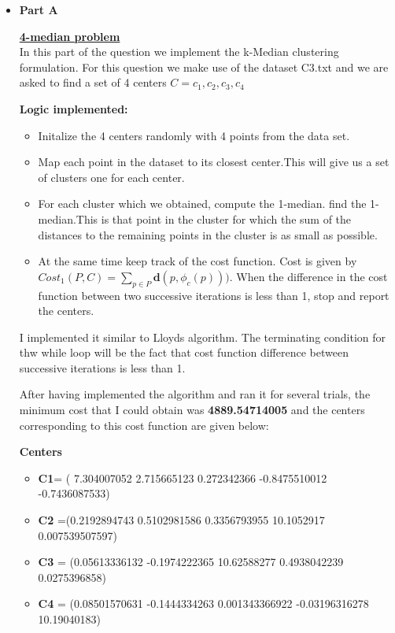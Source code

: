 \documentclass[11pt]{article}
\begin{document}
\begin{itemize}
	\item[] \textbf{Part A}
	
	\underline{\textbf{4-median problem} }\\
	
	In this part of the question we implement the k-Median clustering formulation. For this question we make use of the dataset C3.txt and we are asked to find a set of 4 centers $C={c_1,c_2,c_3,c_4}$
	
	\textbf{ Logic implemented:}
	\begin{itemize}
		\item Initalize the 4 centers randomly with 4 points from the data set.
		\item Map each point in the dataset to its closest center.This will give us a set of clusters one for each center.
		\item For each cluster which we obtained, compute the 1-median. find the 1-median.This is that point in the cluster for which the sum of the distances to the remaining points in the cluster is as small as possible. 
		\item At the same time keep track of the cost function. Cost is given by $Cost_1(P,C)= \sum_{p \in P}^{}\textbf{d}(p,\phi_c(p)))$. When the difference in the cost function between two successive iterations is less than 1, stop and report the centers.
	\end{itemize}
	
	I implemented it similar to Lloyds algorithm. The terminating condition for thw while loop will be the fact that cost function difference between successive iterations is  less than 1.
	
	After having implemented the algorithm and ran it for several trials, the minimum cost that I could obtain was \textbf{4889.54714005} and the centers corresponding to this cost function are given below:
	
	\textbf{ Centers}
	\begin{itemize}
		\item \textbf{C1}= ( 7.304007052	2.715665123	0.272342366	-0.8475510012	-0.7436087533) 
		\item \textbf{C2} =(0.2192894743	0.5102981586	0.3356793955	10.1052917	0.007539507597)
		\item \textbf{C3} = (0.05613336132	-0.1974222365	10.62588277	0.4938042239	0.0275396858)
		\item \textbf{C4} = (0.08501570631	-0.1444334263	0.001343366922	-0.03196316278	10.19040183)
		

\end{itemize}
\end{itemize}
\end{document}
